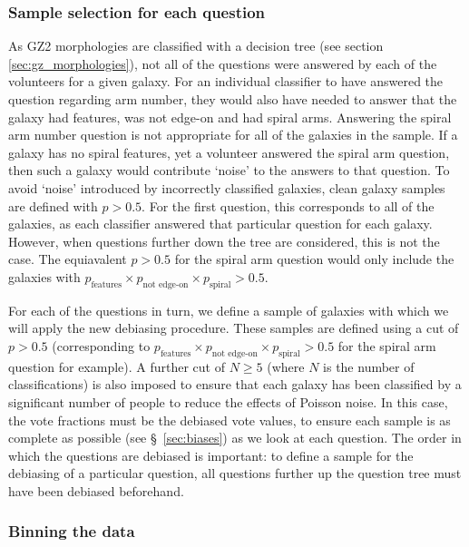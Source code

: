 \documentclass[useAMS,usenatbib]{mn2e}
\begin{document}
\subsubsection{Sample selection for each question}
\label{sec:sample_selection_per_question}

As GZ2 morphologies are classified with a decision tree (see section \ref{sec:gz_morphologies}), not all of the questions were answered by each of the volunteers for a given galaxy. For an individual classifier to have answered the question regarding arm number, they would also have needed to answer that the galaxy had features, was not edge-on and had spiral arms. Answering the spiral arm number question is not appropriate for all of the galaxies in the sample. If a galaxy has no spiral features, yet a volunteer answered the spiral arm question, then such a galaxy would contribute `noise' to the answers to that question. To avoid `noise' introduced by incorrectly classified galaxies, clean galaxy samples are defined with $p > 0.5$. For the first question, this corresponds to all of the galaxies, as each classifier answered that particular question for each galaxy. However, when questions further down the tree are considered, this is not the case. The equiavalent $p>0.5$ for the spiral arm question would only include the galaxies with $p_{\textrm{features}} \times p_{\textrm{not edge-on}} \times p_{\textrm{spiral}} > 0.5$. 

For each of the questions in turn, we define a sample of galaxies with which we will apply the new debiasing procedure. These samples are defined using a cut of $p>0.5$ (corresponding to $p_{\textrm{features}} \times p_{\textrm{not edge-on}} \times p_{\textrm{spiral}} > 0.5$ for the spiral arm question for example). A further cut of $N \geq 5$ (where $N$ is the number of classifications) is also imposed to ensure that each galaxy has been classified by a significant number of people to reduce the effects of Poisson noise. In this case, the vote fractions must be the debiased vote values, to ensure each sample is as complete as possible (see \S~\ref{sec:biases}) as we look at each question. The order in which the questions are debiased is important: to define a sample for the debiasing of a particular question, all questions further up the question tree must have been debiased beforehand.
\subsubsection{Binning the data}
\label{sec:binning}
\end{document}
